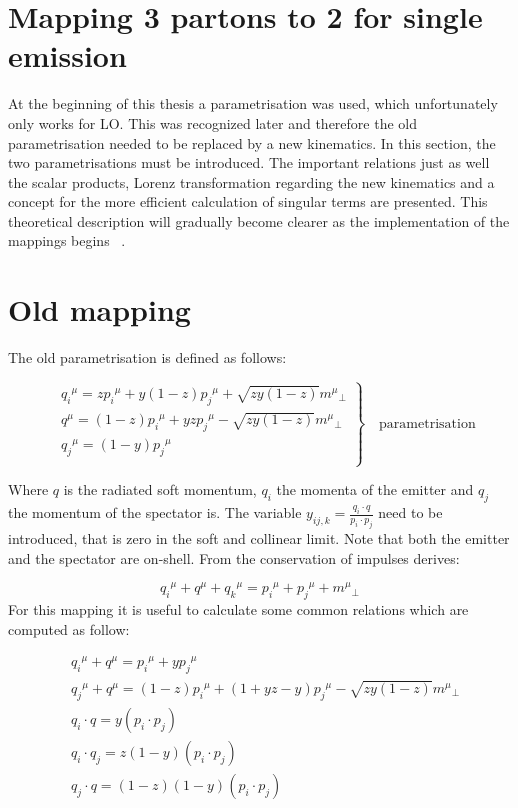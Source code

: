 \section{Mapping 3 partons to 2 for single emission}
\label{mapping}
At the beginning of this thesis a parametrisation was used, which unfortunately only works for LO. This was recognized later and therefore the old parametrisation needed to be replaced by a new kinematics. In this section, the two parametrisations must be introduced. The important relations just as well the scalar products, Lorenz transformation regarding the new kinematics and a concept for the more efficient calculation of singular terms are presented.
This theoretical description will gradually become clearer as the implementation of the mappings begins ~\cite{Platzer:2011dq, Platzer:2018pmd, Platzer:2009jq, Gieseke:2003rz}.
\section{Old mapping}
The old parametrisation is defined as follows: 
	
\begin{equation}
	\left.\begin{aligned}
	&{q_i}^{\mu} = z{p_i}^{\mu} + y(1-z){p_j}^{\mu} + \sqrt{zy(1-z)}{m^{\mu}}_{\bot} \\
	&{q}^{\mu}   = (1-z){p_i}^{\mu} + yz {p_j}^{\mu} - \sqrt{zy(1-z)}{m^{\mu}}_{\bot} \\
	&{q_j}^{\mu} = (1-y) {p_j}^{\mu} \\
		\end{aligned}
	\right\}
	\quad \text{parametrisation}
	\label{par}
\end{equation}

Where $ q $ is the radiated soft momentum, $ q_i $ the momenta of the emitter and $ q_j $ the momentum of the spectator is.
The variable $ y_{ij,k} = \frac{q_i \cdot q}{p_i \cdot p_j}$ need to be introduced, that is zero in the soft and collinear limit. Note that both the emitter and the spectator are on-shell. From the conservation of impulses derives:

\begin{equation}
{q_i}^{\mu}+q^{\mu}+ {q_k}^{\mu}={p_i}^{\mu}+{p_j}^{\mu}+{m^{\mu}}_{\bot}
\label{tot}
\end{equation}
\pagebreak
For this mapping it is useful to calculate some common relations which are computed as follow:

\begin{equation}
\begin{split}
&{q_i}^{\mu} +{q}^{\mu}      = {p_i}^{\mu} + y{p_j}^{\mu} \\
&{q_j}^{\mu} +{q}^{\mu}      = (1-z){p_i}^{\mu} + (1+yz-y) {p_j}^{\mu} - \sqrt{zy(1-z)}{m^{\mu}}_{\bot}\\
&q_i \cdot q = y(p_i \cdot p_j)\\
&q_i \cdot q_j = z(1-y) (p_i \cdot p_j)\\
&q_j \cdot q = (1-z)(1-y) (p_i \cdot p_j)
\end{split}
\end{equation}


